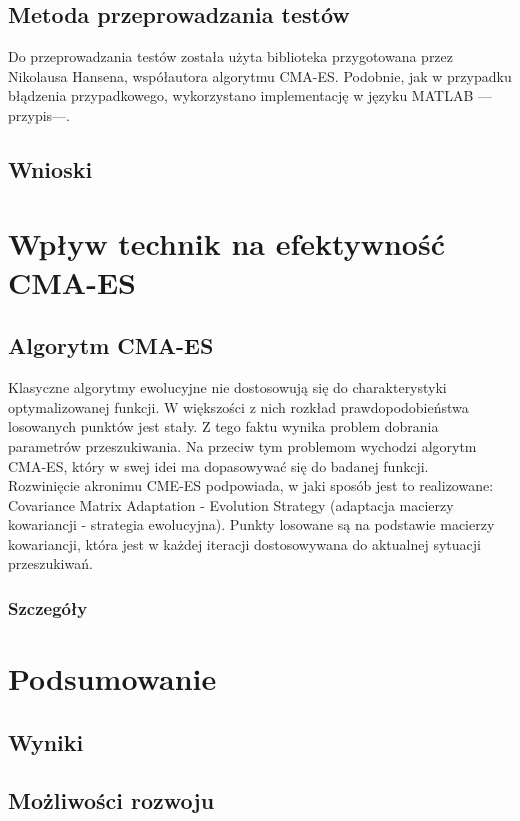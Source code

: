 \documentclass{mini}
\begin{document}
\subsection{Metoda przeprowadzania testów}
Do przeprowadzania testów została użyta biblioteka przygotowana przez Nikolausa Hansena, współautora algorytmu CMA-ES. Podobnie, jak w przypadku błądzenia przypadkowego, wykorzystano implementację w języku MATLAB ---przypis---.

\subsection{Wnioski}

\pagebreak

\section{Wpływ technik na efektywność CMA-ES}

\subsection{Algorytm CMA-ES}
Klasyczne algorytmy ewolucyjne nie dostosowują się do charakterystyki optymalizowanej funkcji. W większości z nich rozkład prawdopodobieństwa losowanych punktów jest stały. Z tego faktu wynika problem dobrania parametrów przeszukiwania. Na przeciw tym problemom wychodzi algorytm CMA-ES, który w swej idei ma dopasowywać się do badanej funkcji.\\
Rozwinięcie akronimu CME-ES podpowiada, w jaki sposób jest to realizowane: Covariance Matrix Adaptation - Evolution Strategy (adaptacja macierzy kowariancji - strategia ewolucyjna). Punkty losowane są na podstawie macierzy kowariancji, która jest w każdej iteracji dostosowywana do aktualnej sytuacji przeszukiwań.

\subsubsection*{Szczegóły}

\pagebreak

\section{Podsumowanie}

\subsection{Wyniki}

\subsection{Możliwości rozwoju}

\pagebreak

\begin{thebibliography}{9}

\end{thebibliography}

\makestatement
\end{document}
